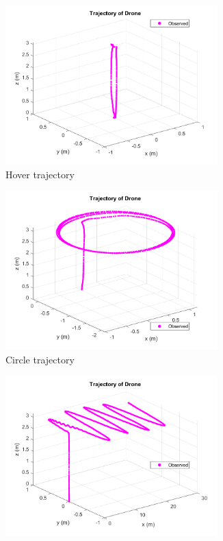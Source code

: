 \documentclass[letterpaper, paper,11pt]{AAS}	%
\begin{document}
\begin{figure}[H]
\centering
\begin{subfigure}{.4\textwidth}
	\centering
	\includegraphics[width=0.9\textwidth]{../hover1_just_traj}
	\caption{Hover trajectory}
	\label{fig:hover1_just_traj}
\end{subfigure}%
\begin{subfigure}{.4\textwidth}
	\centering
	\includegraphics[width=0.9\textwidth]{../circle1_just_traj}
	\caption{Circle trajectory}
	\label{fig:circle1_just_traj}
\end{subfigure}
\begin{subfigure}{.4\textwidth}
	\centering
	\includegraphics[width=0.9\textwidth]{../sine1_just_traj}

\end{subfigure}
\end{figure}
\end{document}

